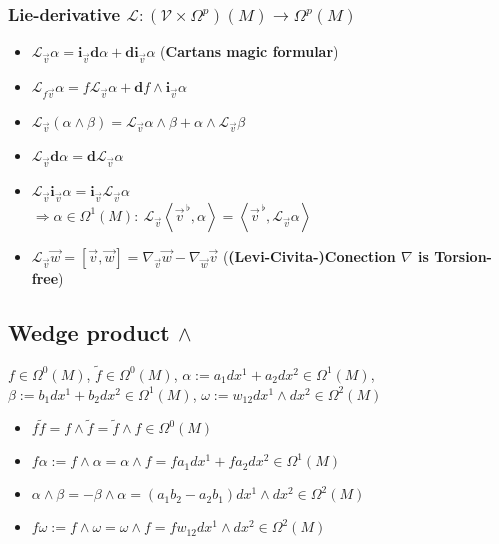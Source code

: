 \documentclass{scrartcl}
\newcommand{\exd}{\mathbf{d}}
\newcommand{\vecflat}[1]{\vec{#1}^{\,\flat}}
\renewcommand{\i}{\mathbf{i}}
\renewcommand{\L}{\mathbf{\mathcal{L}}}
\begin{document}
      \subsubsection{Lie-derivative \( \L:\left(\mathcal{V}\times\Omega^{p}\right)(M)\rightarrow\Omega^{p}(M) \)}
        \begin{itemize}
          \item \(\L_{\vec{v}}\alpha = \i_{\vec{v}}\exd\alpha + \exd\i_{\vec{v}}\alpha\) 
          (\textbf{Cartans magic formular})
          \item  \( \L_{f\vec{v}}\alpha = f\L_{\vec{v}}\alpha + \exd f\wedge\i_{\vec{v}}\alpha\)
          \item \( \L_{\vec{v}}\left( \alpha\wedge\beta \right) = \L_{\vec{v}}\alpha\wedge\beta + \alpha\wedge\L_{\vec{v}}\beta\)
          \item \(\L_{\vec{v}}\exd\alpha = \exd\L_{\vec{v}}\alpha \)
          \item \(\L_{\vec{v}}\i_{\vec{v}}\alpha = \i_{\vec{v}}\L_{\vec{v}}\alpha \)\\
                \( \Rightarrow \alpha\in\Omega^{1}(M):\ \L_{\vec{v}} \left\langle \vecflat{v}, \alpha \right\rangle  
                                                          = \left\langle \vecflat{v}, \L_{\vec{v}}\alpha \right\rangle\)
          \item \( \L_{\vec{v}}\vec{w} = \left[ \vec{v} , \vec{w} \right] = \nabla_{\vec{v}}\vec{w} - \nabla_{\vec{w}}\vec{v}\)
          (\textbf{(Levi-Civita-)Conection \( \nabla \) is Torsion-free})
        \end{itemize}

    \subsection{Wedge product \( \wedge \)}
      \( f\in \Omega^{0}(M)\),
      \( \tilde{f}\in \Omega^{0}(M) \),
      \( \alpha:= a_{1}dx^{1} + a_{2}dx^{2} \in \Omega^{1}(M) \),
      \( \beta:= b_{1}dx^{1} + b_{2}dx^{2} \in \Omega^{1}(M) \),
      \( \omega:= w_{12}dx^{1}\wedge dx^{2} \in \Omega^{2}(M) \)
      \begin{itemize}
        \item \( f\tilde{f}= f\wedge\tilde{f} = \tilde{f}\wedge f \in \Omega^{0}(M) \)
        \item \( f\alpha := f\wedge\alpha = \alpha\wedge f =  fa_{1}dx^{1} + fa_{2}dx^{2} \in \Omega^{1}(M)\)
        \item \( \alpha\wedge\beta = - \beta\wedge\alpha = \left( a_{1}b_{2} - a_{2}b_{1} \right) dx^{1}\wedge dx^{2} \in \Omega^{2}(M) \)
        \item \( f\omega := f\wedge\omega = \omega\wedge f = fw_{12}dx^{1}\wedge dx^{2} \in \Omega^{2}(M) \)
      \end{itemize}
      
\end{document}
